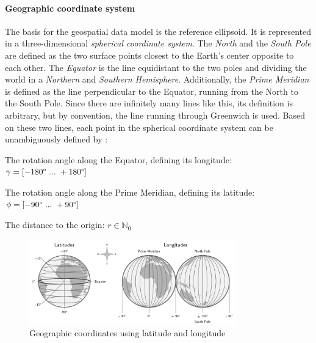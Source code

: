 
\paragraph{Geographic coordinate system} %
\label{ssub:geographic_coordinate_system}

The basis for the geospatial data model is the reference ellipsoid. It is represented in a three-dimensional \emph{spherical coordinate system}. The \emph{North} and the \emph{South Pole} are defined as the two surface points closest to the Earth's center opposite to each other. The \emph{Equator} is the line equidistant to the two poles and dividing the world in a \emph{Northern} and \emph{Southern Hemisphere}. Additionally, the \emph{Prime Meridian} is defined as the line perpendicular to the Equator, running from the North to the South Pole. Since there are infinitely many lines like this, its definition is arbitrary, but by convention, the line running through Greenwich is used. Based on these two lines, each point in the spherical coordinate system can be unambiguously defined by
\cite[pp. 26-28]{bolstad2008gis}:

\begin{compactenum}
  \item The rotation angle along the Equator, defining its longitude: $\gamma = [-180\degree ~...~ +180\degree]$
  \item The rotation angle along the Prime Meridian, defining its latitude: $\phi = [-90\degree ~...~ +90\degree]$
  \item The distance to the origin: $r \in \mathbb{N}_0$
\end{compactenum}

\begin{figure}[ht]
  \vspace{0.5em}
  \centering
  \includegraphics[width=0.8\textwidth]{graphics/basics/hgis/geo_coordinates}
  \caption{Geographic coordinates using latitude and longitude}
  \label{fig:geo-coordinates}
\end{figure}

